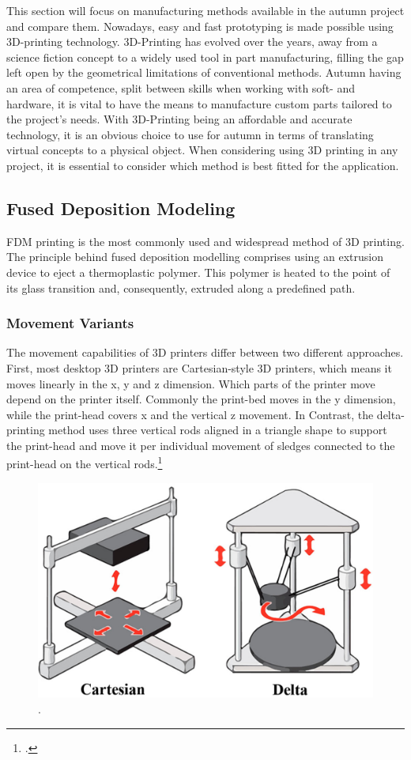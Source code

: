 This section will focus on manufacturing methods available in the autumn project and compare them. Nowadays, easy and fast prototyping is made possible using 3D-printing technology. 3D-Printing has evolved over the years, away from a science fiction concept to a widely used tool in part manufacturing, filling the gap left open by the geometrical limitations of conventional methods.\newline
Autumn having an area of competence, split between skills when working with soft- and hardware, it is vital to have the means to manufacture custom parts tailored to the project's needs. With 3D-Printing being an affordable and accurate technology, it is an obvious choice to use for autumn in terms of translating virtual concepts to a physical object.
When considering using 3D printing in any project, it is essential to consider which method is best fitted for the application.

\subsection{Fused Deposition Modeling}

FDM printing is the most commonly used and widespread method of 3D printing. The principle behind fused deposition modelling comprises using an extrusion device to eject a thermoplastic polymer. This polymer is heated to the point of its glass transition and, consequently, extruded along a predefined path.

\subsubsection{Movement Variants}

The movement capabilities of 3D printers differ between two different approaches. First, most desktop 3D printers are Cartesian-style 3D printers, which means it moves linearly in the x, y and z dimension.
Which parts of the printer move depend on the printer itself. Commonly the print-bed moves in the y dimension, while the print-head covers x and the vertical z movement. In Contrast, the delta-printing method uses three vertical rods aligned in a triangle shape to support the print-head and move it per individual movement of sledges connected to the print-head on the vertical rods.\footcite{all3dpFDM3DPrinting2020}\newline

\begin{figure}[h]
	\centering
	\includegraphics[width=0.6\linewidth]{img/cartesianDeltaPrinting}
	\caption{.}
	\label{fig:custom_parts_printerMovement}
\end{figure}

